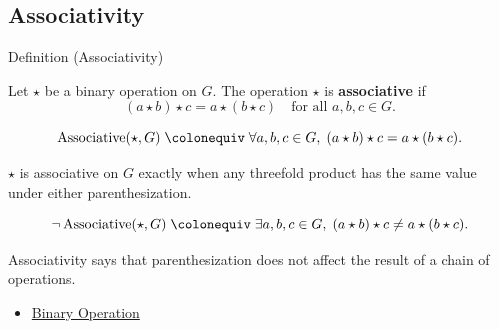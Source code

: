 \subsection*{Associativity}
\label{subsec:associativity}

\begin{definitionbox}{Definition (Associativity)}
\begin{definition}[Associativity]
\label{def:algebraic-associativity}
Let $\star$ be a binary operation on $G$.
The operation $\star$ is \textbf{associative} if
\[
(a \star b) \star c = a \star (b \star c)
\quad \text{for all } a,b,c \in G.
\]
\end{definition}
\end{definitionbox}

\begin{remark*}
\[
\operatorname{Associative}(\star,G)
\;\colonequiv\;
\forall a,b,c \in G,\;
(a \star b) \star c = a \star (b \star c).
\]
\end{remark*}

\begin{remark*}
$\star$ is associative on $G$ exactly when any threefold product has the same
value under either parenthesization.
\end{remark*}

\begin{remark*}
\[
\neg\operatorname{Associative}(\star,G)
\;\colonequiv\;
\exists a,b,c\in G,\;
(a\star b)\star c\neq a\star(b\star c).
\]
\end{remark*}

\begin{remark*}[Interpretation]
Associativity says that parenthesization does not affect the result of a
chain of operations.
\end{remark*}

\begin{dependencies}
\begin{itemize}
  \item \hyperref[def:binary-operation]{Binary Operation}
\end{itemize}
\end{dependencies}
